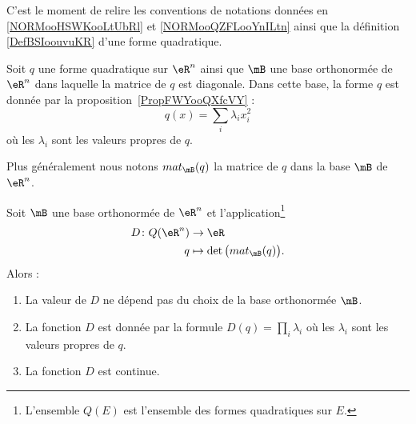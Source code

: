 C'est le moment de relire les conventions de notations données en \ref{NORMooHSWKooLtUbRl} et \ref{NORMooQZFLooYnILtn} ainsi que la définition \ref{DefBSIoouvuKR} d'une forme quadratique.

Soit \( q\) une forme quadratique sur \( \eR^n\) ainsi que \( \mB\) une base orthonormée de \( \eR^n\) dans laquelle la matrice de  \( q\) est diagonale. Dans cette base, la forme \( q\) est donnée par la proposition~\ref{PropFWYooQXfcVY} :
\begin{equation}
	q(x)=\sum_i\lambda_ix_i^2
\end{equation}
où les \( \lambda_i\) sont les valeurs propres de \( q\).

Plus généralement nous notons \( mat_{\mB}(q)\) la matrice de \( q\) dans la base \( \mB\) de \( \eR^n\).

\begin{proposition} \label{PropOXWooYrDKpw}
	Soit \( \mB\) une base orthonormée de \( \eR^n\) et l'application\footnote{L'ensemble \( Q(E)\) est l'ensemble des formes quadratiques sur \( E\).}
	\begin{equation}
		\begin{aligned}
			D\colon Q(\eR^n) & \to \eR                                \\
			q                & \mapsto \det\big( mat_{\mB}(q) \big) .
		\end{aligned}
	\end{equation}
	Alors :
	\begin{enumerate}
		\item
		      La valeur de \( D\) ne dépend pas du choix de la base orthonormée \( \mB\).
		\item
		      La fonction \( D\) est donnée par la formule \( D(q)=\prod_i\lambda_i\) où les \( \lambda_i\) sont les valeurs propres de \( q\).
		\item
		      La fonction \( D\) est continue.
	\end{enumerate}
\end{proposition}

